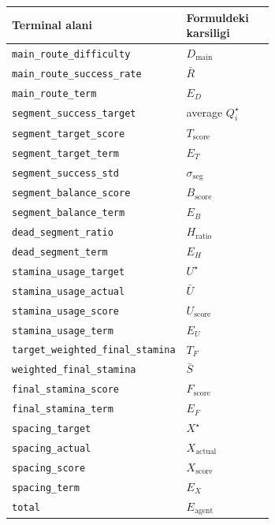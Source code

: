 \documentclass[11pt]{article}
\begin{document}
\begin{tabular}{|l|p{0.66\linewidth}|}
\hline
Terminal alani & Formuldeki karsiligi \\
\hline
\texttt{main\_route\_difficulty} & $D_{\text{main}}$ \\
\hline
\texttt{main\_route\_success\_rate} & $\bar{R}$ \\
\hline
\texttt{main\_route\_term} & $E_D$ \\
\hline
\texttt{segment\_success\_target} & average $Q_i^\star$ \\
\hline
\texttt{segment\_target\_score} & $T_{\text{score}}$ \\
\hline
\texttt{segment\_target\_term} & $E_T$ \\
\hline
\texttt{segment\_success\_std} & $\sigma_{\text{seg}}$ \\
\hline
\texttt{segment\_balance\_score} & $B_{\text{score}}$ \\
\hline
\texttt{segment\_balance\_term} & $E_B$ \\
\hline
\texttt{dead\_segment\_ratio} & $H_{\text{ratio}}$ \\
\hline
\texttt{dead\_segment\_term} & $E_H$ \\
\hline
\texttt{stamina\_usage\_target} & $U^\star$ \\
\hline
\texttt{stamina\_usage\_actual} & $\bar{U}$ \\
\hline
\texttt{stamina\_usage\_score} & $U_{\text{score}}$ \\
\hline
\texttt{stamina\_usage\_term} & $E_U$ \\
\hline
\texttt{target\_weighted\_final\_stamina} & $T_F$ \\
\hline
\texttt{weighted\_final\_stamina} & $\bar{S}$ \\
\hline
\texttt{final\_stamina\_score} & $F_{\text{score}}$ \\
\hline
\texttt{final\_stamina\_term} & $E_F$ \\
\hline
\texttt{spacing\_target} & $X^\star$ \\
\hline
\texttt{spacing\_actual} & $X_{\text{actual}}$ \\
\hline
\texttt{spacing\_score} & $X_{\text{score}}$ \\
\hline
\texttt{spacing\_term} & $E_X$ \\
\hline
\texttt{total} & $E_{\text{agent}}$ \\
\hline
\end{tabular}
\end{document}
